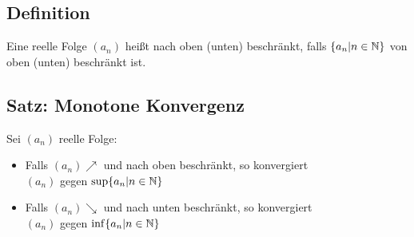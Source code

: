 \documentclass[10pt, a4paper, fleqn]{article}
\begin{document}
    \subsection{Definition}
    Eine reelle Folge $(a_n)$ heißt nach oben (unten) beschränkt, falls
    $\{a_n | n \in \mathbb{N}\}$ von oben (unten) beschränkt ist.

    \subsection{Satz: Monotone Konvergenz}

    Sei $(a_n)$ reelle Folge:
    \begin{itemize}
        \item Falls $(a_n) \nearrow$ und nach oben beschränkt, so konvergiert \\
        $(a_n)$ gegen $\sup\{a_n | n \in \mathbb{N}\}$
        \item Falls $(a_n) \searrow$ und nach unten beschränkt, so konvergiert \\
        $(a_n)$ gegen $\inf\{a_n | n \in \mathbb{N}\}$
    \end{itemize}
\ifdefined\MAINDOC\else
\end{document}
